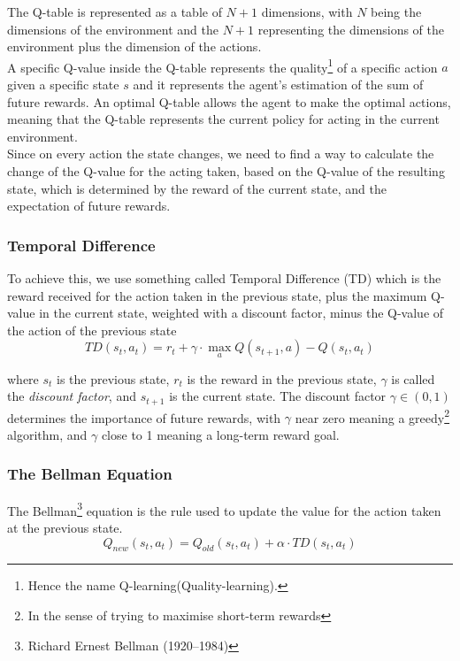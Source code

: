 \documentclass[11pt]{article}
\begin{document}
\begin{multicols}{2}
The Q-table is represented as a table of $N+1$ dimensions, with $N$ being the dimensions of the environment and the $N+1$ representing the dimensions of the environment plus the dimension of the actions.\\
A specific Q-value inside the Q-table represents the quality\footnote{Hence the name Q-learning(Quality-learning).} of a specific action $a$ given a specific state $s$ and it represents the agent's estimation of the sum of future rewards. An optimal Q-table allows the agent to make the optimal actions, meaning that the Q-table represents the current policy for acting in the current environment.\\
Since on every action the state changes, we need to find a way to calculate the change of the Q-value for the acting taken, based on the Q-value of the resulting state, which is determined by the reward of the current state, and the expectation of future rewards.

\subsubsection{Temporal Difference}
To achieve this, we use something called Temporal Difference (TD) which is the reward received for the action taken in the previous state, plus the maximum Q-value in the current state, weighted with a discount factor, minus the Q-value of the action of the previous state
\begin{equation*}
    TD(s_{t}, a_{t}) = r_{t}+\gamma\cdot\max_{a}Q(s_{t+1},a)-Q(s_{t},a_{t})
\end{equation*}

where $s_{t}$ is the previous state, $r_{t}$ is the reward in the previous state, $\gamma$ is called the \textit{discount factor}, and $s_{t+1}$ is the current state. The discount factor $\gamma\in(0,1)$ determines the importance of future rewards, with $\gamma$ near zero meaning a greedy\footnote{In the sense of trying to maximise short-term rewards} algorithm, and $\gamma$ close to 1 meaning a long-term reward goal.

\subsubsection{The Bellman Equation}

The Bellman\footnote{Richard Ernest Bellman (1920–1984)} equation is the rule used to update the value for the action taken at the previous state.
\begin{equation*}
    Q_{new}(s_{t},a_{t})=Q_{old}(s_{t},a_{t})+\alpha\cdot TD(s_{t},a_{t})
\end{equation*}


\end{multicols}
\end{document}
